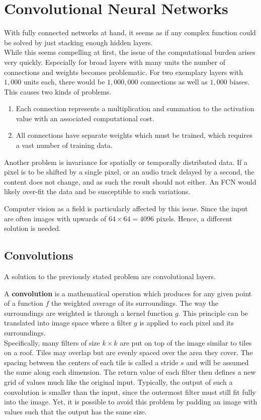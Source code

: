 \section{Convolutional Neural Networks}
With fully connected networks at hand, it seems as if any complex function could be solved by just stacking enough hidden layers.\\
While this seems compelling at first, the issue of the computational burden arises very quickly.
Especially for broad layers with many units the number of connections and weights becomes problematic.
For two exemplary layers with $1,000$ units each, there would be $1,000,000$ connections as well as $1,000$ biases.
This causes two kinds of problems.
\begin{enumerate}
    \item Each connection represents a multiplication and summation to the activation value with an associated computational cost.
    \item All connections have separate weights which must be trained, which requires a vast number of training data.
\end{enumerate}

Another problem is invariance for spatially or temporally distributed data.
If a pixel is to be shifted by a single pixel, or an audio track delayed by a second, the content does not change, and as such the result should not either.
An FCN would likely over-fit the data and be susceptible to such variations.

Computer vision as a field is particularly affected by this issue.
Since the input are often images with upwards of $64 \times 64 = 4096$ pixels.
Hence, a different solution is needed.

\subsection{Convolutions}
A solution to the previously stated problem are convolutional layers.

A \textbf{convolution} is a mathematical operation which produces for any given point of a function $f$ the weighted average of its surroundings.
The way the surroundings are weighted is through a kernel function $g$.
This principle can be translated into image space where a filter $g$ is applied to each pixel and its surroundings.\\
Specifically, many filters of size $k \times k$ are put on top of the image similar to tiles on a roof.
Tiles may overlap but are evenly spaced over the area they cover.
The spacing between the centers of each tile is called a stride $s$ and will be assumed the same along each dimension.
The return value of each filter then defines a new grid of values much like the original input.
Typically, the output of such a convolution is smaller than the input, since the outermost filter must still fit fully into the image.
Yet, it is possible to avoid this problem by padding an image with values such that the output has the same size.

